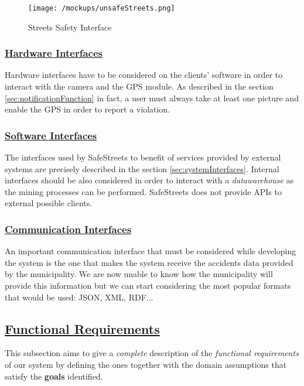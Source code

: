 	 \begin{figure}[h]
	 	\centering
	 	\begin{minipage}{0.7\textwidth}
	 		\centering
	 		\texttt{[image: /mockups/unsafeStreets.png]}
	 		\caption{Streets Safety Interface}
	 	\end{minipage}
	 \end{figure} 
 
	\FloatBarrier
	
	\subsubsection[Hardware Interfaces]{\hyperlink{toc}{Hardware Interfaces}}
		Hardware interfaces have to be considered on the clients' software in order to interact with the camera and the GPS module. As described in the section \ref{sec:notificationFunction} in fact, a user must always take at least one picture and enable the GPS in order to report a violation. 
		
	\subsubsection[Software Interfaces]{\hyperlink{toc}{Software Interfaces}}
		The interfaces used by SafeStreets to benefit of services provided by external systems are precisely described in the section \ref{sec:systemInterfaces}. Internal interfaces should be also considered in order to interact with a \emph{datawarehouse} as the mining processes can be performed. SafeStreets does not provide APIs to external possible clients.
		
	\subsubsection[Communication Interfaces]{\hyperlink{toc}{Communication Interfaces}}
		An important communication interface that must be considered while developing the system is the one that makes the system receive the accidents data provided by the municipality. We are now unable to know how the municipality will provide this information but we can start considering the most popular formats that would be used: JSON, XML, RDF... 

\subsection[Functional Requirements]{\hyperlink{toc}{Functional Requirements}}
	\label{sec:functionalRequirements}
	This subsection aims to give a \emph{complete} description of the \emph{functional requirements} of our system by defining the ones together with the domain assumptions that satisfy the \textbf{goals} identified.
	
